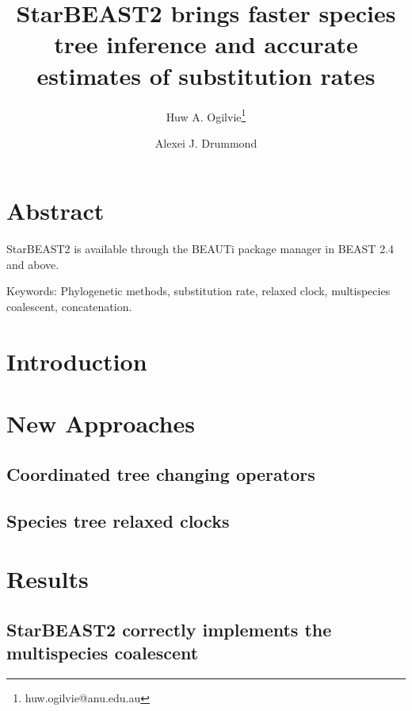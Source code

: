 \documentclass[12pt]{article}
\begin{document}
\title{StarBEAST2 brings faster species tree inference and accurate estimates of substitution rates}
\author[1,2]{Huw A. Ogilvie\thanks{huw.ogilvie@anu.edu.au}}
\author[2,3]{Alexei J. Drummond}

\maketitle

\clearpage

\justifying

\section{Abstract}

StarBEAST2 is available through the BEAUTi package manager in BEAST 2.4 and above.

Keywords: Phylogenetic methods, substitution rate, relaxed clock, multispecies coalescent, concatenation.

\section{Introduction}


\section{New Approaches}

\subsection{Coordinated tree changing operators}

\subsection{Species tree relaxed clocks}

\section{Results}

\subsection{StarBEAST2 correctly implements the multispecies coalescent}
\end{document}
